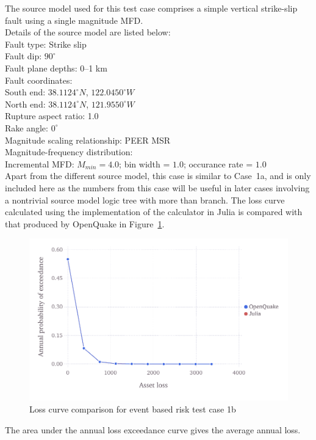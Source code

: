 The source model used for this test case comprises a simple vertical strike-slip fault using a single magnitude MFD.\\

\noindent Details of the source model are listed below:\\

\noindent
Fault type: Strike slip\\
Fault dip: $90^{\circ}$\\
Fault plane depths: 0--1 km\\
Fault coordinates:\\
South end: $38.1124^{\circ} N$, $122.0450^{\circ} W$\\
North end: $38.1124^{\circ} N$, $121.9550^{\circ} W$\\
Rupture aspect ratio: 1.0\\
Rake angle: $0^{\circ}$\\
Magnitude scaling relationship: PEER MSR\\
Magnitude-frequency distribution:\\
Incremental MFD: $M_{min} = 4.0$; bin width = $1.0$; occurance rate = $1.0$\\

Apart from the different source model, this case is similar to Case~1a, and is only included here as the numbers from this case will be useful in later cases involving a nontrivial source model logic tree with more than branch. The loss curve calculated using the implementation of the calculator in Julia is compared with that produced by OpenQuake in Figure~\ref{fig:lc-ebr-1b}.

\begin{figure}[htbp]
\centering
\includegraphics[width=12cm]{qareport/figures/fig-lc-ebr-1b}
\caption{Loss curve comparison for event based risk test case 1b}
\label{fig:lc-ebr-1b}
\end{figure}

The area under the annual loss exceedance curve gives the average annual loss.
